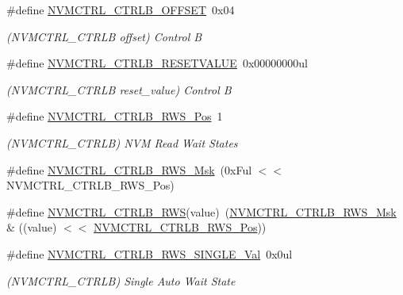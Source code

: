 \begin{DoxyCompactItemize}
\#define \mbox{\hyperlink{group___s_a_m_d21___n_v_m_c_t_r_l_ga96b31df212035cedc4f6a370222e5b67}{N\+V\+M\+C\+T\+R\+L\+\_\+\+C\+T\+R\+L\+B\+\_\+\+O\+F\+F\+S\+ET}}~0x04
\begin{DoxyCompactList}\small\item\em (N\+V\+M\+C\+T\+R\+L\+\_\+\+C\+T\+R\+LB offset) Control B \end{DoxyCompactList}\item 
\#define \mbox{\hyperlink{group___s_a_m_d21___n_v_m_c_t_r_l_gac0a835cf0ee617133dc445147d2af448}{N\+V\+M\+C\+T\+R\+L\+\_\+\+C\+T\+R\+L\+B\+\_\+\+R\+E\+S\+E\+T\+V\+A\+L\+UE}}~0x00000000ul
\begin{DoxyCompactList}\small\item\em (N\+V\+M\+C\+T\+R\+L\+\_\+\+C\+T\+R\+LB reset\+\_\+value) Control B \end{DoxyCompactList}\item 
\#define \mbox{\hyperlink{group___s_a_m_d21___n_v_m_c_t_r_l_ga43e4b7eb29abd297bee59f003d715e26}{N\+V\+M\+C\+T\+R\+L\+\_\+\+C\+T\+R\+L\+B\+\_\+\+R\+W\+S\+\_\+\+Pos}}~1
\begin{DoxyCompactList}\small\item\em (N\+V\+M\+C\+T\+R\+L\+\_\+\+C\+T\+R\+LB) N\+VM Read Wait States \end{DoxyCompactList}\item 
\#define \mbox{\hyperlink{group___s_a_m_d21___n_v_m_c_t_r_l_gab5ad30e9547cbcc159748e0f014567f0}{N\+V\+M\+C\+T\+R\+L\+\_\+\+C\+T\+R\+L\+B\+\_\+\+R\+W\+S\+\_\+\+Msk}}~(0x\+Ful $<$$<$ N\+V\+M\+C\+T\+R\+L\+\_\+\+C\+T\+R\+L\+B\+\_\+\+R\+W\+S\+\_\+\+Pos)
\item 
\#define \mbox{\hyperlink{group___s_a_m_d21___n_v_m_c_t_r_l_ga5b3f59c294e4c40249e9b361cb580e6f}{N\+V\+M\+C\+T\+R\+L\+\_\+\+C\+T\+R\+L\+B\+\_\+\+R\+WS}}(value)~(\mbox{\hyperlink{group___s_a_m_d21___n_v_m_c_t_r_l_gab5ad30e9547cbcc159748e0f014567f0}{N\+V\+M\+C\+T\+R\+L\+\_\+\+C\+T\+R\+L\+B\+\_\+\+R\+W\+S\+\_\+\+Msk}} \& ((value) $<$$<$ \mbox{\hyperlink{group___s_a_m_d21___n_v_m_c_t_r_l_ga43e4b7eb29abd297bee59f003d715e26}{N\+V\+M\+C\+T\+R\+L\+\_\+\+C\+T\+R\+L\+B\+\_\+\+R\+W\+S\+\_\+\+Pos}}))
\item 
\#define \mbox{\hyperlink{group___s_a_m_d21___n_v_m_c_t_r_l_ga38b52d3de7998f872c54a599e4e21f25}{N\+V\+M\+C\+T\+R\+L\+\_\+\+C\+T\+R\+L\+B\+\_\+\+R\+W\+S\+\_\+\+S\+I\+N\+G\+L\+E\+\_\+\+Val}}~0x0ul
\begin{DoxyCompactList}\small\item\em (N\+V\+M\+C\+T\+R\+L\+\_\+\+C\+T\+R\+LB) Single Auto Wait State \end{DoxyCompactList}\item 

\end{DoxyCompactItemize}
